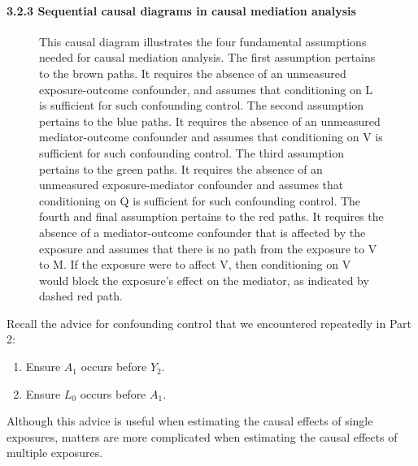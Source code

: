 \documentclass[
  singlecolumn]{article}
\let\oldparagraph\paragraph
\renewcommand{\paragraph}[1]{\oldparagraph{#1}\mbox{}}
\providecommand{\tightlist}{%
  \setlength{\itemsep}{0pt}\setlength{\parskip}{0pt}}\usepackage{longtable,booktabs,array}
\begin{document}
\paragraph{3.2.3 Sequential causal diagrams in causal mediation
analysis}\label{sequential-causal-diagrams-in-causal-mediation-analysis}

\begin{figure}


\caption{\label{fig-dag-mediation-assumptions}This causal diagram
illustrates the four fundamental assumptions needed for causal mediation
analysis. The first assumption pertains to the brown paths. It requires
the absence of an unmeasured exposure-outcome confounder, and assumes
that conditioning on L is sufficient for such confounding control. The
second assumption pertains to the blue paths. It requires the absence of
an unmeasured mediator-outcome confounder and assumes that conditioning
on V is sufficient for such confounding control. The third assumption
pertains to the green paths. It requires the absence of an unmeasured
exposure-mediator confounder and assumes that conditioning on Q is
sufficient for such confounding control. The fourth and final assumption
pertains to the red paths. It requires the absence of a mediator-outcome
confounder that is affected by the exposure and assumes that there is no
path from the exposure to V to M. If the exposure were to affect V, then
conditioning on V would block the exposure's effect on the mediator, as
indicated by dashed red path.}

\end{figure}%

Recall the advice for confounding control that we encountered repeatedly
in Part 2:

\begin{enumerate}
\def\labelenumi{\arabic{enumi}.}
\tightlist
\item
  Ensure \(A_1\) occurs before \(Y_2\).
\item
  Ensure \(L_0\) occurs before \(A_1\).
\end{enumerate}

Although this advice is useful when estimating the causal effects of
single exposures, matters are more complicated when estimating the
causal effects of multiple exposures.
\end{document}

